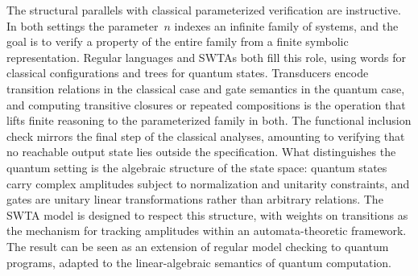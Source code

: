 The structural parallels with classical parameterized verification are
instructive. In both settings the parameter~$n$ indexes an infinite family of
systems, and the goal is to verify a property of the entire family from a
finite symbolic representation. Regular languages and SWTAs both fill this
role, using words for classical configurations and trees for quantum states.
Transducers encode transition relations in the classical case and gate semantics
in the quantum case, and computing transitive closures or repeated compositions
is the operation that lifts finite reasoning to the parameterized family in
both. The functional inclusion check mirrors the final step of the classical
analyses, amounting to verifying that no reachable output state lies outside
the specification. What distinguishes the quantum setting is the
algebraic structure of the state space: quantum states carry complex amplitudes
subject to normalization and unitarity constraints, and gates are unitary linear
transformations rather than arbitrary relations. The SWTA model is designed to
respect this structure, with weights on transitions as the mechanism for
tracking amplitudes within an automata-theoretic framework. The result can be
seen as an extension of regular model checking to quantum programs, adapted to
the linear-algebraic semantics of quantum computation.
